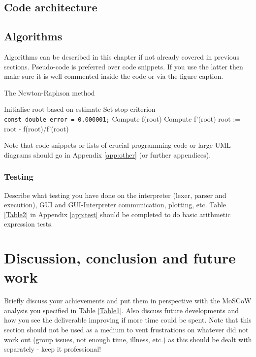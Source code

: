 \documentclass[a4paper, oneside, 11pt]{report}
\begin{document}
\section{Code architecture}

\section{Algorithms}

Algorithms can be described in this chapter if not already covered in previous sections. Pseudo-code is preferred over code snippets. If you use the latter then make sure it is well commented inside the code or via the figure caption. 

\begin{algorithm}[th]
\caption{ The Newton-Raphson method }
\begin{algorithmic}[1]
\STATE Initialise root based on estimate
\STATE Set stop criterion
\\ \texttt{const double error = 0.000001;}
	\STATE Compute f(root)
	\STATE Compute f'(root)
	\STATE root := root - f(root)/f'(root)
\ENDWHILE
\end{algorithmic}
\end{algorithm}


Note that code snippets or lists of crucial programming code or large UML diagrams should go in Appendix \ref{app:other} (or further appendices).

\subsection{Testing}

Describe what testing you have done on the interpreter (lexer, parser and execution), GUI and GUI-Interpreter communication, plotting, etc. Table \ref{Table2} in Appendix \ref{app:test} should be completed to do basic arithmetic expression tests.


\chapter{Discussion, conclusion and future work}

Briefly discuss  your achievements and put them in perspective with the MoSCoW analysis you specified in Table \ref{Table1}. Also discuss future developments and how you see the deliverable improving if more time could be spent. Note that this section should not be used as a medium to vent frustrations on whatever did not work out (group issues, not enough time, illness, etc.) as this should be dealt with separately - keep it professional!
\end{document}
